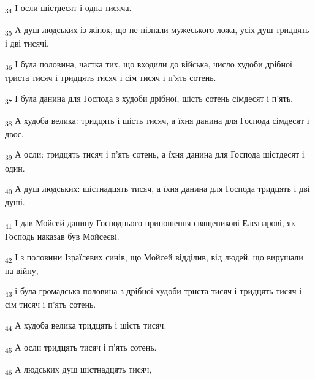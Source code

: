 \begin{tcolorbox}
\textsubscript{34} І осли шістдесят і одна тисяча.
\end{tcolorbox}
\begin{tcolorbox}
\textsubscript{35} А душ людських із жінок, що не пізнали мужеського ложа, усіх душ тридцять і дві тисячі.
\end{tcolorbox}
\begin{tcolorbox}
\textsubscript{36} І була половина, частка тих, що входили до війська, число худоби дрібної триста тисяч і тридцять тисяч і сім тисяч і п'ять сотень.
\end{tcolorbox}
\begin{tcolorbox}
\textsubscript{37} І була данина для Господа з худоби дрібної, шість сотень сімдесят і п'ять.
\end{tcolorbox}
\begin{tcolorbox}
\textsubscript{38} А худоба велика: тридцять і шість тисяч, а їхня данина для Господа сімдесят і двоє.
\end{tcolorbox}
\begin{tcolorbox}
\textsubscript{39} А осли: тридцять тисяч і п'ять сотень, а їхня данина для Господа шістдесят і один.
\end{tcolorbox}
\begin{tcolorbox}
\textsubscript{40} А душ людських: шістнадцять тисяч, а їхня данина для Господа тридцять і дві душі.
\end{tcolorbox}
\begin{tcolorbox}
\textsubscript{41} І дав Мойсей данину Господнього приношення священикові Елеазарові, як Господь наказав був Мойсеєві.
\end{tcolorbox}
\begin{tcolorbox}
\textsubscript{42} І з половини Ізраїлевих синів, що Мойсей відділив, від людей, що вирушали на війну,
\end{tcolorbox}
\begin{tcolorbox}
\textsubscript{43} і була громадська половина з дрібної худоби триста тисяч і тридцять тисяч і сім тисяч і п'ять сотень.
\end{tcolorbox}
\begin{tcolorbox}
\textsubscript{44} А худоба велика тридцять і шість тисяч.
\end{tcolorbox}
\begin{tcolorbox}
\textsubscript{45} А осли тридцять тисяч і п'ять сотень.
\end{tcolorbox}
\begin{tcolorbox}
\textsubscript{46} А людських душ шістнадцять тисяч,
\end{tcolorbox}
